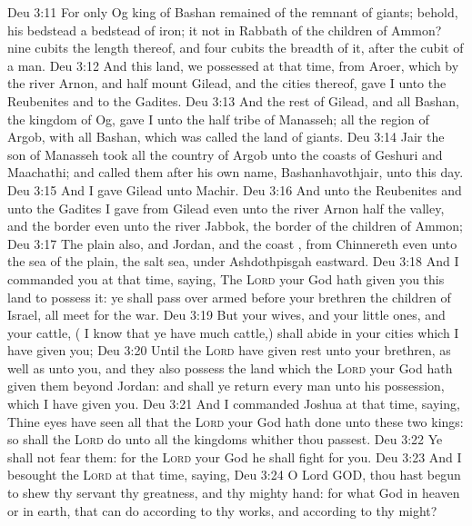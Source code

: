 \vs Deu 3:11 For only Og king of Bashan remained of the remnant of giants; behold, his bedstead  a bedstead of iron;  it not in Rabbath of the children of Ammon? nine cubits  the length thereof, and four cubits the breadth of it, after the cubit of a man.
\vs Deu 3:12 And this land,  we possessed at that time, from Aroer, which  by the river Arnon, and half mount Gilead, and the cities thereof, gave I unto the Reubenites and to the Gadites.
\vs Deu 3:13 And the rest of Gilead, and all Bashan,  the kingdom of Og, gave I unto the half tribe of Manasseh; all the region of Argob, with all Bashan, which was called the land of giants.
\vs Deu 3:14 Jair the son of Manasseh took all the country of Argob unto the coasts of Geshuri and Maachathi; and called them after his own name, Bashanhavothjair, unto this day.
\vs Deu 3:15 And I gave Gilead unto Machir.
\vs Deu 3:16 And unto the Reubenites and unto the Gadites I gave from Gilead even unto the river Arnon half the valley, and the border even unto the river Jabbok,  the border of the children of Ammon;
\vs Deu 3:17 The plain also, and Jordan, and the coast , from Chinnereth even unto the sea of the plain,  the salt sea, under Ashdothpisgah eastward.
\vs Deu 3:18 And I commanded you at that time, saying, The \textsc{Lord} your God hath given you this land to possess it: ye shall pass over armed before your brethren the children of Israel, all  meet for the war.
\vs Deu 3:19 But your wives, and your little ones, and your cattle, ( I know that ye have much cattle,) shall abide in your cities which I have given you;
\vs Deu 3:20 Until the \textsc{Lord} have given rest unto your brethren, as well as unto you, and  they also possess the land which the \textsc{Lord} your God hath given them beyond Jordan: and  shall ye return every man unto his possession, which I have given you.
\vs Deu 3:21 And I commanded Joshua at that time, saying, Thine eyes have seen all that the \textsc{Lord} your God hath done unto these two kings: so shall the \textsc{Lord} do unto all the kingdoms whither thou passest.
\vs Deu 3:22 Ye shall not fear them: for the \textsc{Lord} your God he shall fight for you.
\vs Deu 3:23 And I besought the \textsc{Lord} at that time, saying,
\vs Deu 3:24 O Lord GOD, thou hast begun to shew thy servant thy greatness, and thy mighty hand: for what God  in heaven or in earth, that can do according to thy works, and according to thy might?
